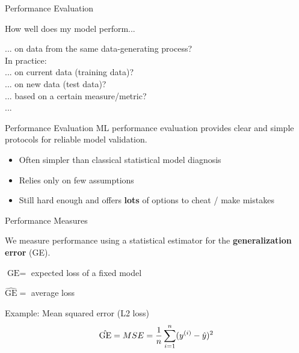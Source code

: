 \documentclass[11pt,compress,t,notes=noshow, xcolor=table]{beamer}
\begin{document}
\begin{vbframe}{Performance Evaluation}
\begin{center}
How well does my model perform...\\

\lz


\lz
... on data from the same data-generating process?\\
\lz
In practice:\\
\lz
... on current data (training data)?\\
... on new data (test data)?\\
... based on a certain measure/metric?\\
...

\end{center}
\end{vbframe}




\begin{vbframe}{Performance Evaluation}
ML performance evaluation provides clear and simple protocols for reliable model
validation. 

\begin{itemize}
\item Often simpler than classical statistical model diagnosis 
\item Relies only on few assumptions
\item Still hard enough and offers \textbf{lots} of options to cheat / make mistakes 
\end{itemize}
\end{vbframe}

\begin{vbframe}{Performance Measures}

We measure performance using a statistical estimator for the 
\textbf{generalization error} (GE).

\lz
$\text{GE} = $ expected loss of a fixed model

\lz
$\hat{\text{GE}} = $ average loss 

\lz \lz

Example: Mean squared error (L2 loss)
\[
\hat{\text{GE}} = MSE = \frac{1}{n} \sum_{i=1}^n (y^{(i)} - \hat{y})^2
\]

\end{vbframe}
\end{document}
